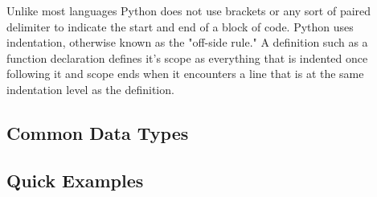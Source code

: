 \documentclass[12pt]{article}
\begin{document}
Unlike most languages Python does not use brackets or any sort of paired delimiter to indicate the start and end of a block of code. Python uses indentation, otherwise known as the "off-side rule." A definition such as a function declaration defines it's scope as everything that is indented once following it and scope ends when it encounters a line that is at the same indentation level as the definition. 




\subsection*{Common Data Types}






\subsection*{Quick Examples}
\end{document}
